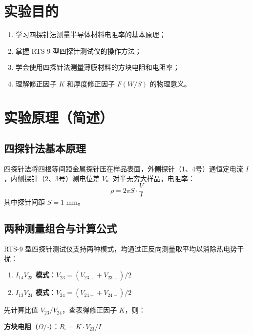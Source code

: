 
\section{实验目的}

\begin{enumerate}[label=\arabic*、, leftmargin=4em, labelsep=0pt]
    \item 学习四探针法测量半导体材料电阻率的基本原理；
    \item 掌握 RTS-9 型四探针测试仪的操作方法；
    \item 学会使用四探针法测量薄膜材料的方块电阻和电阻率；
    \item 理解修正因子 $K$ 和厚度修正因子 $F(W/S)$ 的物理意义。
\end{enumerate}

\section{实验原理（简述）}

\subsection{四探针法基本原理}

四探针法将四根等间距金属探针压在样品表面，外侧探针（1、4号）通恒定电流 $I$，内侧探针（2、3号）测电位差 $V$。对半无穷大样品，电阻率：
\begin{equation}
    \rho = 2\pi S \cdot \frac{V}{I}
\end{equation}
其中探针间距 $S = 1$ mm。

\subsection{两种测量组合与计算公式}

RTS-9 型四探针测试仪支持两种模式，均通过正反向测量取平均以消除热电势干扰：

\begin{enumerate}[label=\arabic*、, leftmargin=4em, labelsep=0pt]
    \item \textbf{$I_{14}V_{23}$ 模式}：$V_{23} = (V_{23+} + V_{23-})/2$
    \item \textbf{$I_{13}V_{24}$ 模式}：$V_{24} = (V_{24+} + V_{24-})/2$
\end{enumerate}

先计算比值 $V_{23}/V_{24}$，查表得修正因子 $K$，则：

\textbf{方块电阻}（$\Omega/\square$）：$R_{\square} = K \cdot V_{23}/I$

